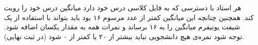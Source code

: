 هر استاد با دسترسی که به فایل کلاسی درس خود دارد میانگین درس خود را رویت کند. همچنین چنانچه این میانگین کمتر از عدد مرسوم ۱۶ بود باید
بتواند با استفاده از یک شیفت یونیفرم میانگین را به ۱۶ برساند و نمرات همه به مقدار یکسان اضافه شود. توجه شود نمره‌ی هیچ دانشجویی نباید بیشتر از ۲۰ یا کمتر از ۰ شود (در ثبت نهایی).